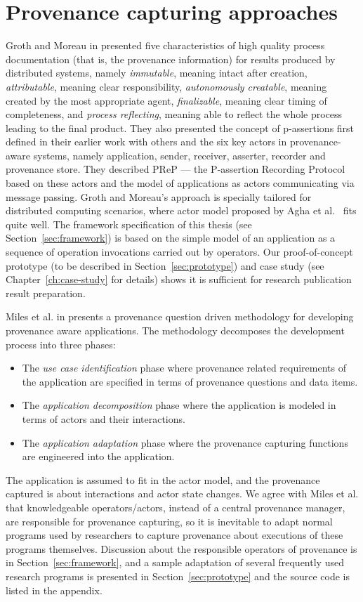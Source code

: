 \section{Provenance capturing approaches}
Groth and Moreau in \cite{groth2009recording} presented five characteristics of high quality process documentation (that is, the provenance information) for results produced by distributed systems, namely \emph{immutable}, meaning intact after creation, \emph{attributable}, meaning clear responsibility, \emph{autonomously creatable}, meaning created by the most appropriate agent, \emph{finalizable}, meaning clear timing of completeness, and \emph{process reflecting}, meaning able to reflect the whole process leading to the final product. They also presented the concept of p-assertions first defined in their earlier work with others \cite{groth2006architecture} and the six key actors in provenance-aware systems, namely application, sender, receiver, asserter, recorder and provenance store. They described PReP --- the P-assertion Recording Protocol based on these actors and the model of applications as actors communicating via message passing. Groth and Moreau's approach is specially tailored for distributed computing scenarios, where actor model proposed by Agha et al.~\cite{agha1985actors,agha1997foundation} fits quite well. The framework specification of this thesis (see Section~\ref{sec:framework}) is based on the simple model of an application as a sequence of operation invocations carried out by operators. Our proof-of-concept prototype (to be described in Section~\ref{sec:prototype}) and case study (see Chapter~\ref{ch:case-study} for details) shows it is sufficient for research publication result preparation.

Miles et al. in \cite{miles2011prime} presents a provenance question driven methodology for developing provenance aware applications. The methodology decomposes the development process into three phases:
\begin{itemize}
	\item The \emph{use case identification} phase where provenance related requirements of the application are specified in terms of provenance questions and data items.
	\item The \emph{application decomposition} phase where the application is modeled in terms of actors and their interactions.
	\item The \emph{application adaptation} phase where the provenance capturing functions are engineered into the application.
\end{itemize}
The application is assumed to fit in the actor model, and the provenance captured is about interactions and actor state changes. We agree with Miles et al. that knowledgeable operators/actors, instead of a central provenance manager, are responsible for provenance capturing, so it is inevitable to adapt normal programs used by researchers to capture provenance about executions of these programs themselves. Discussion about the responsible operators of provenance is in Section~\ref{sec:framework}, and a sample adaptation of several frequently used research programs is presented in Section~\ref{sec:prototype} and the source code is listed in the appendix.

